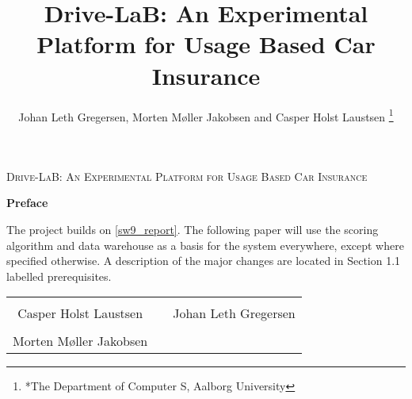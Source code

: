 \documentclass[a4paper, 10pt, conference]{ieeeconf}      %
\title{\LARGE \bf
Drive-LaB: An Experimental Platform for Usage Based Car Insurance
}
\author{Johan Leth Gregersen, Morten Møller Jakobsen and Casper Holst Laustsen%
\thanks{*The Department of Computer S, Aalborg University}%
}
\begin{document}
\begin{titlepage}
	\centering
	{\scshape\LARGE Drive-LaB: An Experimental Platform for Usage Based Car Insurance\par}
	\vspace{0.5cm}
	{\huge\bfseries Preface\par}
	\vspace{0.5cm}
	The project builds on \ref{sw9_report}. The following paper will use the scoring algorithm and data warehouse as a basis for the system everywhere, except where specified otherwise. A description of the major changes are located in Section 1.1 labelled prerequisites. 

\begin{table} [h]
	\centering
	\vspace{2cm}
		\begin{tabular}{c c c}
			\rowcolors{0}{}{}
			\underline{\phantom{JAERJAERJAERJAERGO}} & \phantom{cookies} & \underline{\phantom{JAERJAERJAERJAERGO}} \\
			Casper Holst Laustsen & \phantom{cookies} & Johan Leth Gregersen\\[1.5cm]
		    \rowcolor{white}\underline{\phantom{JAERJAERJAERJAERGO}} &\phantom{cookies} & {\phantom{JAERJAERJAERJAERGO}} \\
			Morten Møller Jakobsen & \phantom{cookies} & \\[1.5cm]				
		\end{tabular}
\end{table}

\end{titlepage}

\maketitle
\thispagestyle{empty}
\pagestyle{empty}

























\end{document}
